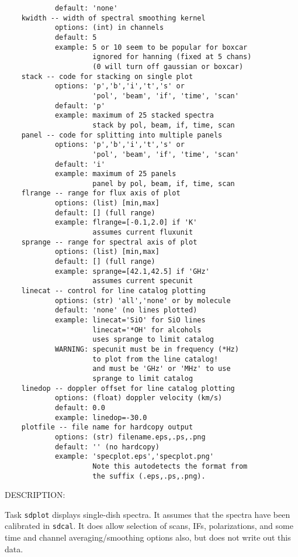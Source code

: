 \begin{itemize}
\begin{verbatim}
            default: 'none'
    kwidth -- width of spectral smoothing kernel
            options: (int) in channels 
            default: 5
            example: 5 or 10 seem to be popular for boxcar
                     ignored for hanning (fixed at 5 chans)
                     (0 will turn off gaussian or boxcar)
    stack -- code for stacking on single plot
            options: 'p','b','i','t','s' or
                     'pol', 'beam', 'if', 'time', 'scan'
            default: 'p'
            example: maximum of 25 stacked spectra
                     stack by pol, beam, if, time, scan
    panel -- code for splitting into multiple panels
            options: 'p','b','i','t','s' or
                     'pol', 'beam', 'if', 'time', 'scan'
            default: 'i'
            example: maximum of 25 panels
                     panel by pol, beam, if, time, scan
    flrange -- range for flux axis of plot
            options: (list) [min,max]
            default: [] (full range)
            example: flrange=[-0.1,2.0] if 'K'
                     assumes current fluxunit
    sprange -- range for spectral axis of plot
            options: (list) [min,max]
            default: [] (full range)
            example: sprange=[42.1,42.5] if 'GHz'
                     assumes current specunit
    linecat -- control for line catalog plotting
            options: (str) 'all','none' or by molecule
            default: 'none' (no lines plotted)
            example: linecat='SiO' for SiO lines
                     linecat='*OH' for alcohols
                     uses sprange to limit catalog
            WARNING: specunit must be in frequency (*Hz)
                     to plot from the line catalog!
                     and must be 'GHz' or 'MHz' to use 
                     sprange to limit catalog
    linedop -- doppler offset for line catalog plotting
            options: (float) doppler velocity (km/s)
            default: 0.0
            example: linedop=-30.0
    plotfile -- file name for hardcopy output
            options: (str) filename.eps,.ps,.png
            default: '' (no hardcopy)
            example: 'specplot.eps','specplot.png'
                     Note this autodetects the format from
                     the suffix (.eps,.ps,.png).
\end{verbatim}
    
    DESCRIPTION:
    
    Task {\tt sdplot} displays single-dish spectra.  
    It assumes that the spectra have been calibrated in {\tt sdcal}.
    It does allow selection of scans, IFs, polarizations, and
    some time and channel averaging/smoothing options also,
    but does not write out this data.
    

\end{itemize}
